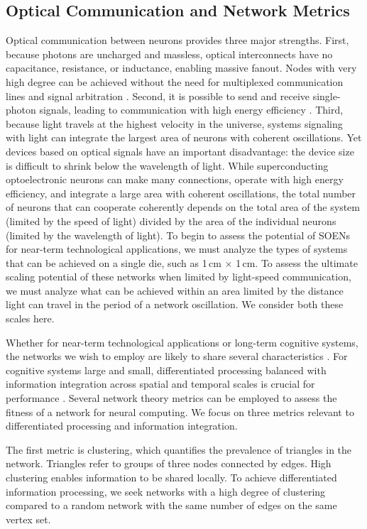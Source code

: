 \documentclass[twocolumn]{article}
\begin{document}
\subsection{\label{sec:opticalCommunicationAndGraphMetrics}Optical Communication and Network Metrics}
Optical communication between neurons provides three major strengths. First, because photons are uncharged and massless, optical interconnects have no capacitance, resistance, or inductance, enabling massive fanout. Nodes with very high degree can be achieved without the need for multiplexed communication lines and signal arbitration \cite{lide2015}. Second, it is possible to send and receive single-photon signals, leading to communication with high energy efficiency \cite{mave2013}. Third, because light travels at the highest velocity in the universe, systems signaling with light can integrate the largest area of neurons with coherent oscillations. Yet devices based on optical signals have an important disadvantage: the device size is difficult to shrink below the wavelength of light. While superconducting optoelectronic neurons can make many connections, operate with high energy efficiency, and integrate a large area with coherent oscillations, the total number of neurons that can cooperate coherently depends on the total area of the system (limited by the speed of light) divided by the area of the individual neurons (limited by the wavelength of light). To begin to assess the potential of SOENs for near-term technological applications, we must analyze the types of systems that can be achieved on a single die, such as 1\,cm $\times$ 1\,cm. To assess the ultimate scaling potential of these networks when limited by light-speed communication, we must analyze what can be achieved within an area limited by the distance light can travel in the period of a network oscillation. We consider both these scales here.

Whether for near-term technological applications or long-term cognitive systems, the networks we wish to employ are likely to share several characteristics \cite{busp2009}. For cognitive systems large and small, differentiated processing balanced with information integration across spatial and temporal scales is crucial for performance \cite{tosp2003,to2004,to2008,bu2006,sp2010,base2011,haah2017}. Several network theory metrics can be employed to assess the fitness of a network for neural computing. We focus on three metrics relevant to differentiated processing and information integration. 

The first metric is clustering, which quantifies the prevalence of triangles in the network. Triangles refer to groups of three nodes connected by edges. High clustering enables information to be shared locally. To achieve differentiated information processing, we seek networks with a high degree of clustering compared to a random network with the same number of edges on the same vertex set. 
\end{document}
